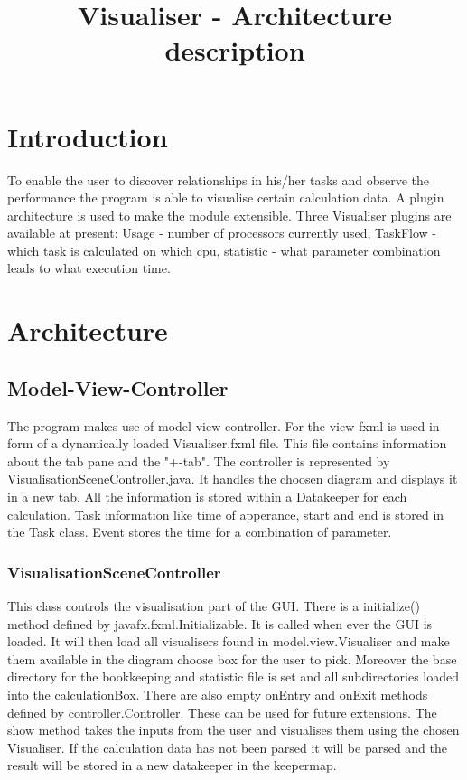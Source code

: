 \documentclass{article}
\title{Visualiser - Architecture description}
\begin{document}
\section{Introduction}
To enable the user to discover relationships in his/her tasks and observe the performance the program is able to visualise certain calculation data. A plugin architecture is used to make the module extensible. Three Visualiser plugins are available at present: Usage - number of processors currently used, TaskFlow - which task is calculated on which cpu, statistic - what parameter combination leads to what execution time.

\section{Architecture}

\subsection{Model-View-Controller}
The program makes use of model view controller. For the view fxml is used in form of a dynamically loaded Visualiser.fxml file. This file contains information about the tab pane and the "+-tab". The controller is represented by VisualisationSceneController.java. It handles the choosen diagram and displays it in a new tab. All the information is stored within a Datakeeper for each calculation. Task information like time of apperance, start and end is stored in the Task class. Event stores the time for a combination of parameter.

\subsubsection{VisualisationSceneController}
This class controls the visualisation part of the GUI. 
There is a initialize() method defined by javafx.fxml.Initializable. It is called when ever the GUI is loaded. It will then load all visualisers found in model.view.Visualiser and make them available in the diagram choose box for the user to pick. Moreover the base directory for the bookkeeping and statistic file is set and all subdirectories loaded into the calculationBox.
There are also empty onEntry and onExit methods defined by controller.Controller. These can be used for future extensions.
The show method takes the inputs from the user and visualises them using the chosen Visualiser. If the calculation data has not been parsed it will be parsed and the result will be stored in a new datakeeper in the keepermap. 
\end{document}
